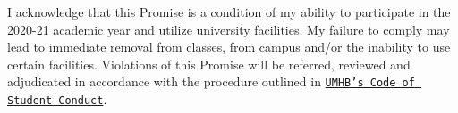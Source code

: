 \documentclass[
]{article}
\begin{document}
I acknowledge that this Promise is a condition of my ability to
participate in the 2020-21 academic year and utilize university
facilities. My failure to comply may lead to immediate removal from
classes, from campus and/or the inability to use certain facilities.
Violations of this Promise will be referred, reviewed and adjudicated in
accordance with the procedure outlined in
\texttt{\href{https://go.umhb.edu/students/student-handbook}{UMHB’s Code of Student Conduct}}.
\end{document}
